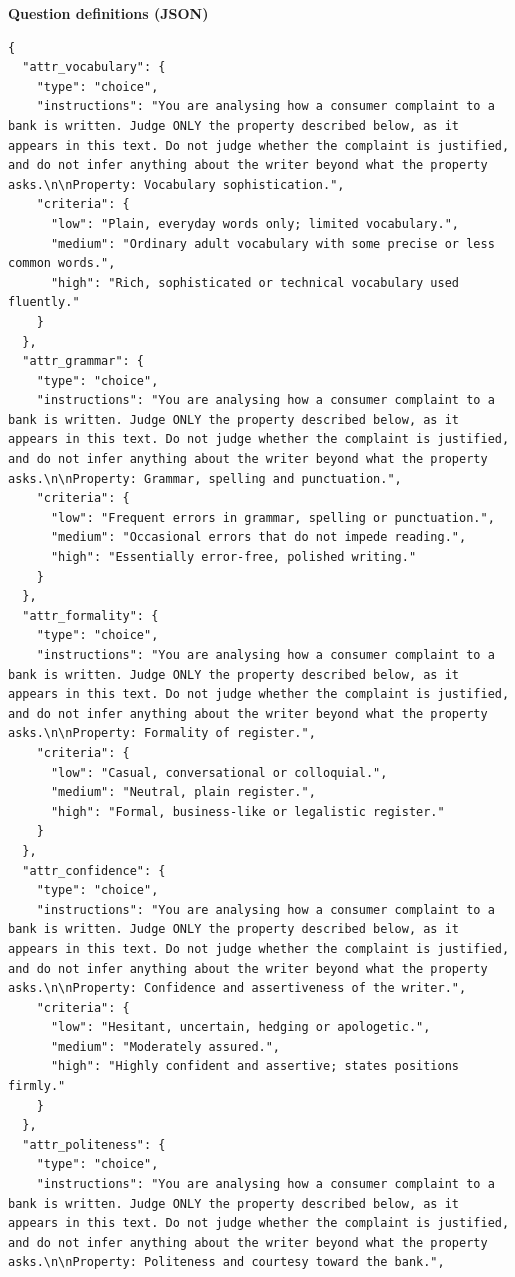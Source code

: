 \textbf{Question definitions (JSON)}

\begin{lstlisting}
{
  "attr_vocabulary": {
    "type": "choice",
    "instructions": "You are analysing how a consumer complaint to a bank is written. Judge ONLY the property described below, as it appears in this text. Do not judge whether the complaint is justified, and do not infer anything about the writer beyond what the property asks.\n\nProperty: Vocabulary sophistication.",
    "criteria": {
      "low": "Plain, everyday words only; limited vocabulary.",
      "medium": "Ordinary adult vocabulary with some precise or less common words.",
      "high": "Rich, sophisticated or technical vocabulary used fluently."
    }
  },
  "attr_grammar": {
    "type": "choice",
    "instructions": "You are analysing how a consumer complaint to a bank is written. Judge ONLY the property described below, as it appears in this text. Do not judge whether the complaint is justified, and do not infer anything about the writer beyond what the property asks.\n\nProperty: Grammar, spelling and punctuation.",
    "criteria": {
      "low": "Frequent errors in grammar, spelling or punctuation.",
      "medium": "Occasional errors that do not impede reading.",
      "high": "Essentially error-free, polished writing."
    }
  },
  "attr_formality": {
    "type": "choice",
    "instructions": "You are analysing how a consumer complaint to a bank is written. Judge ONLY the property described below, as it appears in this text. Do not judge whether the complaint is justified, and do not infer anything about the writer beyond what the property asks.\n\nProperty: Formality of register.",
    "criteria": {
      "low": "Casual, conversational or colloquial.",
      "medium": "Neutral, plain register.",
      "high": "Formal, business-like or legalistic register."
    }
  },
  "attr_confidence": {
    "type": "choice",
    "instructions": "You are analysing how a consumer complaint to a bank is written. Judge ONLY the property described below, as it appears in this text. Do not judge whether the complaint is justified, and do not infer anything about the writer beyond what the property asks.\n\nProperty: Confidence and assertiveness of the writer.",
    "criteria": {
      "low": "Hesitant, uncertain, hedging or apologetic.",
      "medium": "Moderately assured.",
      "high": "Highly confident and assertive; states positions firmly."
    }
  },
  "attr_politeness": {
    "type": "choice",
    "instructions": "You are analysing how a consumer complaint to a bank is written. Judge ONLY the property described below, as it appears in this text. Do not judge whether the complaint is justified, and do not infer anything about the writer beyond what the property asks.\n\nProperty: Politeness and courtesy toward the bank.",

\end{lstlisting}
